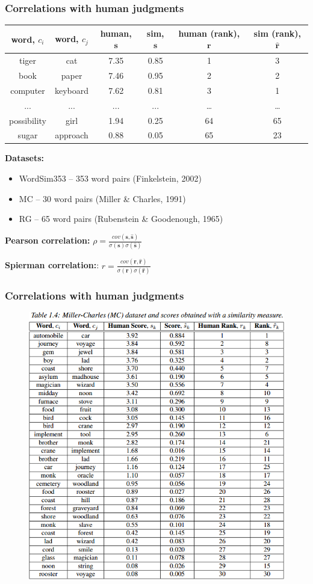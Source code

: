 \begin{frame}
\frametitle{Correlations with human judgments}

\begin{table}[h]\footnotesize
\begin{tabular}{ |c|c|c|c|c|c| }
\hline
  word, $c_i$ & word, $c_j$ & human, $\mathbf{s}$  & sim, $\mathbf{s}$  & human (rank), $\mathbf{r}$ & sim (rank), $\hat{\mathbf{r}}$  \\ \hline \hline
tiger & cat & 7.35 & 0.85 & 1 & 3 \\
book & paper & 7.46 &  0.95 & 2 & 2 \\
computer & keyboard & 7.62 &  0.81 & 3 & 1 \\
... & ... & ... & ...   & \ldots & \ldots \\
possibility & girl & 1.94 & 0.25 & 64 & 65 \\
sugar & approach & 0.88 & 0.05 & 65 & 23 \\ \hline
\end{tabular}
\end{table}


\textbf{Datasets:}

\begin{itemize}
    \item WordSim353 -- 353 word pairs (Finkelstein, 2002)  
    \item MC -- 30 word pairs  (Miller & Charles, 1991)
    \item RG -- 65 word pairs (Rubenstein & Goodenough, 1965)  
\end{itemize}

\textbf{Pearson correlation:}  $\rho = \frac{cov(\mathbf{s},\hat{\mathbf{s}})}{\sigma(\mathbf{s}) \sigma(\hat{\mathbf{s}})}$

 \textbf{Spierman correlation:}: $r = \frac{cov(\mathbf{r},\hat{\mathbf{r}})}{\sigma(\mathbf{r}) \sigma(\hat{\mathbf{r}})}$
\end{frame}



\begin{frame}
\frametitle{Correlations with human judgments}

\begin{figure}
\includegraphics[height=0.6\textwidth]{./figures/rg}
\end{figure}


\end{frame}



